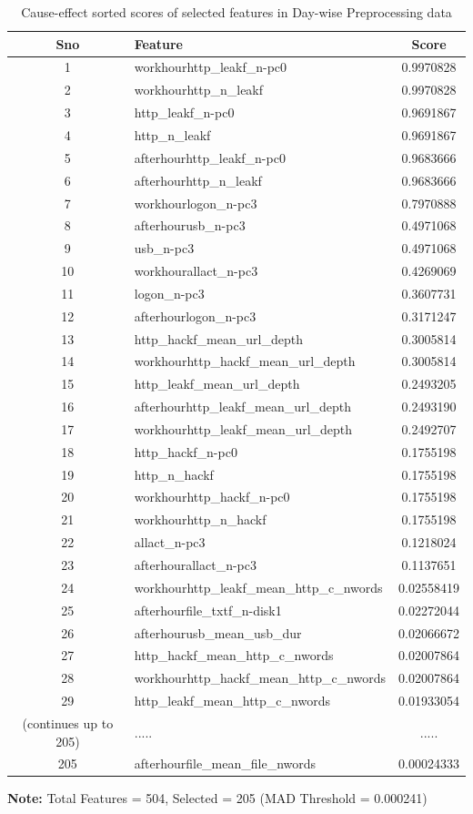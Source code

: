 \begin{table}[!ht]
\centering
\caption{Cause-effect sorted scores of selected features in Day-wise Preprocessing data}
\label{table4d}
\begin{tabular}{clc}
\toprule
\textbf{Sno} & \textbf{Feature} & \textbf{Score} \\
\midrule
1 & workhourhttp\_leakf\_n-pc0 & 0.9970828 \\
2 & workhourhttp\_n\_leakf & 0.9970828 \\
3 & http\_leakf\_n-pc0 & 0.9691867 \\
4 & http\_n\_leakf & 0.9691867 \\
5 & afterhourhttp\_leakf\_n-pc0 & 0.9683666 \\
6 & afterhourhttp\_n\_leakf & 0.9683666 \\
7 & workhourlogon\_n-pc3 & 0.7970888 \\
8 & afterhourusb\_n-pc3 & 0.4971068 \\
9 & usb\_n-pc3 & 0.4971068 \\
10 & workhourallact\_n-pc3 & 0.4269069 \\
11 & logon\_n-pc3 & 0.3607731 \\
12 & afterhourlogon\_n-pc3 & 0.3171247 \\
13 & http\_hackf\_mean\_url\_depth & 0.3005814 \\
14 & workhourhttp\_hackf\_mean\_url\_depth & 0.3005814 \\
15 & http\_leakf\_mean\_url\_depth & 0.2493205 \\
16 & afterhourhttp\_leakf\_mean\_url\_depth & 0.2493190 \\ 17 & workhourhttp\_leakf\_mean\_url\_depth & 0.2492707 \\ 18 & http\_hackf\_n-pc0 & 0.1755198 \\ 19 & http\_n\_hackf & 0.1755198 \\ 20 & workhourhttp\_hackf\_n-pc0 & 0.1755198 \\ 21 & workhourhttp\_n\_hackf & 0.1755198 \\ 22 & allact\_n-pc3 & 0.1218024 \\ 23 & afterhourallact\_n-pc3 & 0.1137651 \\ 24 & workhourhttp\_leakf\_mean\_http\_c\_nwords & 0.02558419 \\ 25 & afterhourfile\_txtf\_n-disk1 & 0.02272044 \\ 26 & afterhourusb\_mean\_usb\_dur & 0.02066672 \\ 27 & http\_hackf\_mean\_http\_c\_nwords & 0.02007864 \\ 28 & workhourhttp\_hackf\_mean\_http\_c\_nwords & 0.02007864 \\ 29 & http\_leakf\_mean\_http\_c\_nwords & 0.01933054 \\ (continues up to 205) &.....&.....\\ 205 & afterhourfile\_mean\_file\_nwords & 0.00024333 \\ \bottomrule
\end{tabular}
\vspace{0.2cm}
\scriptsize{\textbf{Note:} Total Features = 504, Selected = 205 (MAD Threshold = 0.000241)}
\end{table}

